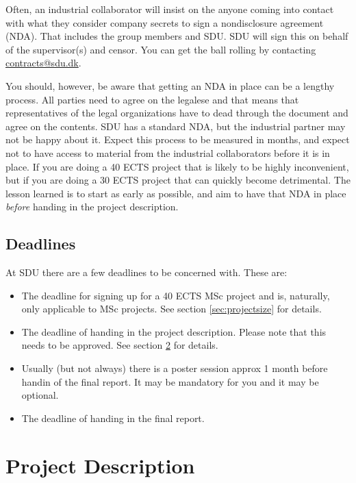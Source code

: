 \documentclass[a4paper]{memoir}
\begin{document}
Often, an industrial collaborator will insist on the anyone coming into contact with what they consider company secrets to sign a nondisclosure agreement (NDA). That includes the group members and SDU. SDU will sign this on behalf of the supervisor(s) and censor. You can get the ball rolling by contacting \href{mailto:contracts@sdu.dk}{contracts@sdu.dk}.

You should, however, be aware that getting an NDA in place can be a lengthy process. All parties need to agree on the legalese and that means that representatives of the legal organizations have to dead through the document and agree on the contents. SDU has a standard NDA, but the industrial partner may not be happy about it. Expect this process to be measured in months, and expect not to have access to material from the industrial collaborators before it is in place. If you are doing a 40 ECTS project that is likely to be highly inconvenient, but if you are doing a 30 ECTS project that can quickly become detrimental. The lesson learned is to start as early as possible, and aim to have that NDA in place \textsl{before} handing in the project description.

\section{Deadlines}

At SDU there are a few deadlines to be concerned with. These are:
\begin{itemize}
  \item The deadline for signing up for a 40 ECTS MSc project and is, naturally, only applicable to MSc projects. See section \ref{sec:projectsize} for details.
  \item The deadline of handing in the project description. Please note that this needs to be approved. See section \ref{sec:projectdesc} for details.
  \item Usually (but not always) there is a poster session approx 1 month before handin of the final report. It may be mandatory for you and it may be optional.
  \item The deadline of handing in the final report.
\end{itemize}

\chapter{Project Description}
\label{sec:projectdesc}
\end{document}
